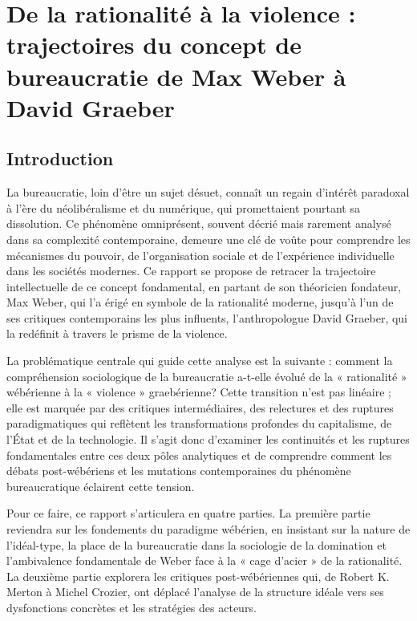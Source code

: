 \part{De la rationalité à la violence : trajectoires du concept de bureaucratie de Max Weber à David Graeber}

\chapter{Introduction}
La bureaucratie, loin d'être un sujet désuet, connaît un regain d'intérêt paradoxal à l'ère du néolibéralisme et du numérique, qui promettaient pourtant sa dissolution. Ce phénomène omniprésent, souvent décrié mais rarement analysé dans sa complexité contemporaine, demeure une clé de voûte pour comprendre les mécanismes du pouvoir, de l'organisation sociale et de l'expérience individuelle dans les sociétés modernes. Ce rapport se propose de retracer la trajectoire intellectuelle de ce concept fondamental, en partant de son théoricien fondateur, Max Weber, qui l'a érigé en symbole de la rationalité moderne, jusqu'à l'un de ses critiques contemporains les plus influents, l'anthropologue David Graeber, qui la redéfinit à travers le prisme de la violence.

La problématique centrale qui guide cette analyse est la suivante : comment la compréhension sociologique de la bureaucratie a-t-elle évolué de la « rationalité »  wébérienne à la « violence »  graebérienne? Cette transition n'est pas linéaire ; elle est marquée par des critiques intermédiaires, des relectures et des ruptures paradigmatiques qui reflètent les transformations profondes du capitalisme, de l'État et de la technologie. Il s'agit donc d'examiner les continuités et les ruptures fondamentales entre ces deux pôles analytiques et de comprendre comment les débats post-wébériens et les mutations contemporaines du phénomène bureaucratique éclairent cette tension.

Pour ce faire, ce rapport s'articulera en quatre parties. La première partie reviendra sur les fondements du paradigme wébérien, en insistant sur la nature de l'idéal-type, la place de la bureaucratie dans la sociologie de la domination et l'ambivalence fondamentale de Weber face à la « cage d'acier »  de la rationalité. La deuxième partie explorera les critiques post-wébériennes qui, de Robert K. Merton à Michel Crozier, ont déplacé l'analyse de la structure idéale vers ses dysfonctions concrètes et les stratégies des acteurs. \\

